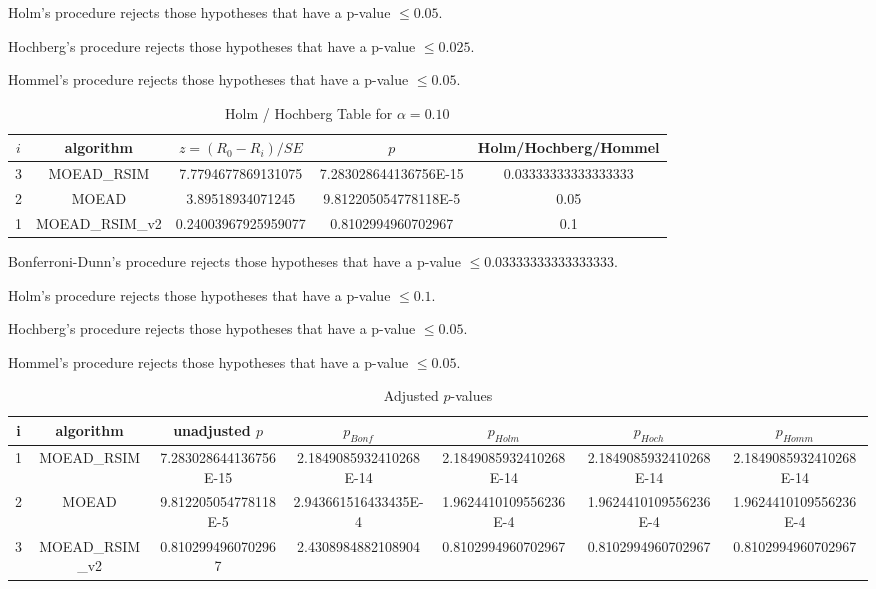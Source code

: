 \documentclass[a4paper,10pt]{article}
\begin{document}
\begin{landscape}
Holm's procedure rejects those hypotheses that have a p-value $\le0.05$.


Hochberg's procedure rejects those hypotheses that have a p-value $\le0.025$.


Hommel's procedure rejects those hypotheses that have a p-value $\le0.05$.


\begin{table}[!htp]
\centering\tiny
\caption{Holm / Hochberg Table for $\alpha=0.10$}
\begin{tabular}{ccccc}
$i$&algorithm&$z=(R_0 - R_i)/SE$&$p$&Holm/Hochberg/Hommel\\
\hline
3&MOEAD_RSIM&7.7794677869131075&7.283028644136756E-15&0.03333333333333333\\
2&MOEAD&3.89518934071245&9.812205054778118E-5&0.05\\
1&MOEAD_RSIM_v2&0.24003967925959077&0.8102994960702967&0.1\\
\hline
\end{tabular}
\end{table}
Bonferroni-Dunn's procedure rejects those hypotheses that have a p-value $\le0.03333333333333333$.


Holm's procedure rejects those hypotheses that have a p-value $\le0.1$.


Hochberg's procedure rejects those hypotheses that have a p-value $\le0.05$.


Hommel's procedure rejects those hypotheses that have a p-value $\le0.05$.


\begin{table}[!htp]
\centering\tiny
\caption{Adjusted $p$-values}
\begin{tabular}{ccccccc}
i&algorithm&unadjusted $p$&$p_{Bonf}$&$p_{Holm}$&$p_{Hoch}$&$p_{Homm}$\\
\hline
1&MOEAD_RSIM&7.283028644136756E-15&2.1849085932410268E-14&2.1849085932410268E-14&2.1849085932410268E-14&2.1849085932410268E-14\\
2&MOEAD&9.812205054778118E-5&2.943661516433435E-4&1.9624410109556236E-4&1.9624410109556236E-4&1.9624410109556236E-4\\
3&MOEAD_RSIM_v2&0.8102994960702967&2.4308984882108904&0.8102994960702967&0.8102994960702967&0.8102994960702967\\
\hline
\end{tabular}
\end{table}


\end{landscape}
\end{document}

